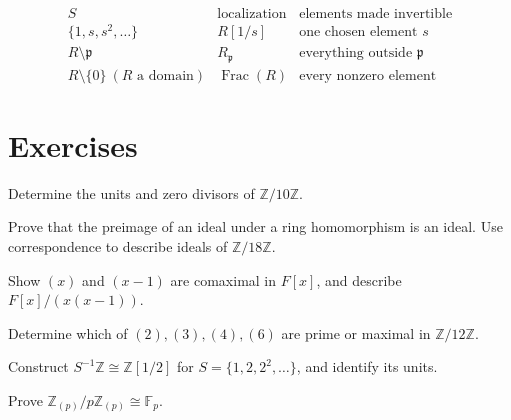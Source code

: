 \[
\begin{array}{c|c|c}
S&\text{localization}&\text{elements made invertible}\\ \hline
\{1,s,s^2,\ldots\}&R[1/s]&\text{one chosen element }s\\
R\setminus\mathfrak p&R_{\mathfrak p}&\text{everything outside }\mathfrak p\\
R\setminus\{0\}\ (R\text{ a domain})&\operatorname{Frac}(R)&
\text{every nonzero element}
\end{array}
\]

\section*{Exercises}
\begin{exercise}[Basic] Determine the units and zero divisors of
\(\mathbb Z/10\mathbb Z\). \end{exercise}
\begin{exercise}[Core] Prove that the preimage of an ideal under a ring
homomorphism is an ideal. Use correspondence to describe ideals of
\(\mathbb Z/18\mathbb Z\). \end{exercise}
\begin{exercise}[Core] Show \((x)\) and \((x-1)\) are comaximal in \(F[x]\),
and describe \(F[x]/(x(x-1))\). \end{exercise}
\begin{exercise}[Core] Determine which of \((2),(3),(4),(6)\) are prime or
maximal in \(\mathbb Z/12\mathbb Z\). \end{exercise}
\begin{exercise}[Further] Construct \(S^{-1}\mathbb Z\cong\mathbb Z[1/2]\)
for \(S=\{1,2,2^2,\ldots\}\), and identify its units. \end{exercise}
\begin{exercise}[Further] Prove
\(\mathbb Z_{(p)}/p\mathbb Z_{(p)}\cong\mathbb F_p\). \end{exercise}
